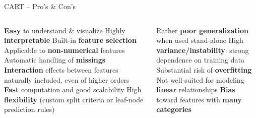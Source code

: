 \begin{frame}{CART -- Pro's \& Con's}

\begin{columns}[onlytextwidth]
  \begin{column}{0.5\textwidth}
    \footnotesize
    \begin{itemize}
      \positem \textbf{Easy} to understand \& visualize
      \positem Highly \textbf{interpretable}
      \positem Built-in \textbf{feature selection}
      \positem Applicable to \textbf{non-numerical} features
      \positem Automatic handling of \textbf{missings} 
      \positem \textbf{Interaction} effects between features naturally included, 
      even of higher orders
      \positem \textbf{Fast} computation and good scalability
      \positem High \textbf{flexibility} (custom split criteria or leaf-node 
      prediction rules)   
    \end{itemize}
  \end{column}
  \begin{column}{0.5\textwidth}
    \footnotesize
    \begin{itemize}
      \negitem Rather \textbf{poor generalization} when used stand-alone 
      \negitem High \textbf{variance/instability}: strong dependence on training 
      data
      \negitem Substantial risk of \textbf{overfitting}
      \negitem Not well-suited for modeling \textbf{linear} relationships
      \negitem \textbf{Bias} toward features with \textbf{many categories}
    \end{itemize}
  \end{column}
\end{columns}

\vfill

\small


\end{frame}


